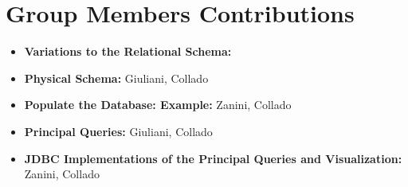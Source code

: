 \documentclass{article}
\begin{document}
\maketitle






\section{Group Members Contributions}
\begin{itemize}
	\item \textbf{Variations to the Relational Schema:} 
	\item \textbf{Physical Schema:} Giuliani, Collado
	\item \textbf{Populate the Database: Example:} Zanini, Collado
	\item \textbf{Principal Queries:} Giuliani, Collado
	\item \textbf{JDBC Implementations of the Principal Queries and Visualization:} Zanini, Collado
\end{itemize}
\end{document}

